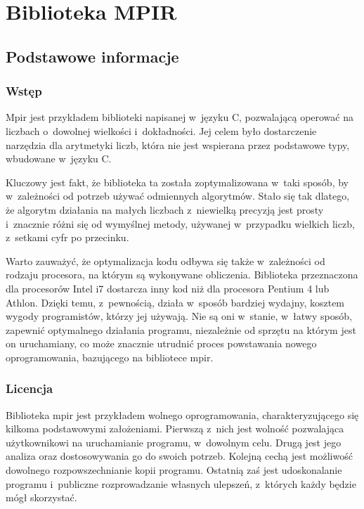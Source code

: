 \section{Biblioteka MPIR}

\subsection{Podstawowe informacje}

\subsubsection{Wstęp}

Mpir jest przykładem biblioteki napisanej w~języku C, pozwalającą operować na liczbach o~dowolnej wielkości i~dokładności. Jej celem było dostarczenie narzędzia dla arytmetyki liczb, która nie jest wspierana przez podstawowe typy, wbudowane w~języku C.

Kluczowy jest fakt, że biblioteka ta została zoptymalizowana w~taki sposób, by w~zależności od potrzeb używać odmiennych algorytmów. Stało się tak dlatego, że algorytm działania na małych liczbach z~niewielką precyzją jest prosty i~znacznie różni się od wymyślnej metody, używanej w~przypadku wielkich liczb, z~setkami cyfr po przecinku.

Warto zauważyć, że optymalizacja kodu odbywa się także w~zależności od rodzaju procesora, na którym są wykonywane obliczenia. Biblioteka przeznaczona dla procesorów Intel i7 dostarcza inny kod niż dla procesora Pentium 4 lub Athlon. Dzięki temu, z~pewnością, działa w~sposób bardziej wydajny, kosztem wygody programistów, którzy jej używają. Nie są oni w~stanie, w~łatwy sposób, zapewnić optymalnego działania programu, niezależnie od sprzętu na którym jest on uruchamiany, co może znacznie utrudnić proces powstawania nowego oprogramowania, bazującego na bibliotece mpir.

\subsubsection{Licencja}

Biblioteka mpir jest przykładem wolnego oprogramowania, charakteryzującego się kilkoma podstawowymi założeniami. Pierwszą z~nich jest wolność pozwalająca użytkownikowi na uruchamianie programu, w~dowolnym celu. Drugą jest jego analiza oraz dostosowywania go do swoich potrzeb. Kolejną cechą jest możliwość dowolnego rozpowszechnianie kopii programu. Ostatnią zaś jest udoskonalanie programu i~publiczne rozprowadzanie własnych ulepszeń, z~których każdy będzie mógł skorzystać.


